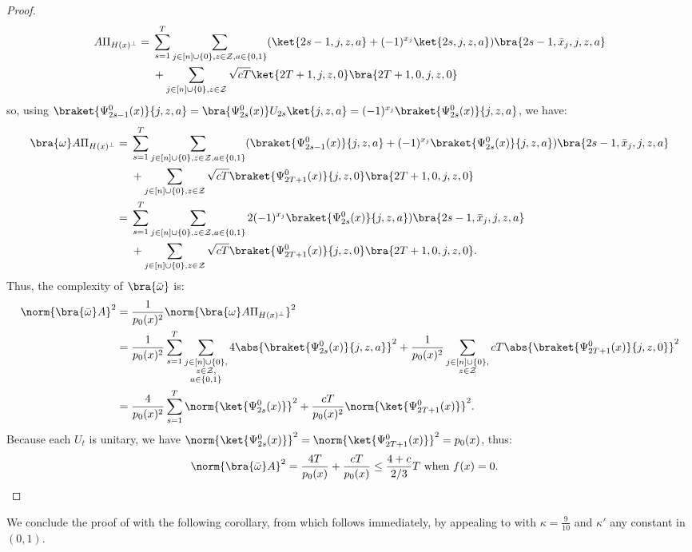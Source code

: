 \documentclass[11pt]{article}
\numberwithin{equation}{section}
\theoremstyle{definition}
\theoremstyle{plain}
\begin{document}
\begin{proof}
\begin{align*}
A\Pi_{H(x)^\bot} ={}& \sum_{s=1}^{T}\sum_{j\in [n]\cup\{0\},z\in{\cal Z},a\in\{0,1\}}(\ket{2s-1,j,z,a}+(-1)^{x_j}\ket{2s,j,z,a})\bra{2s-1,\bar{x}_j,j,z,a}\\
&+\sum_{j\in [n]\cup\{0\},z\in{\cal Z}}\sqrt{cT}\ket{2T+1,j,z,0}\bra{2T+1,0,j,z,0}
\end{align*}
so, using $\braket{\Psi_{2s-1}^0(x)}{j,z,a}=\bra{\Psi_{2s}^0(x)}U_{2s}\ket{j,z,a}=(-1)^{x_j}\braket{\Psi_{2s}^0(x)}{j,z,a}$, we have:
\begin{align*}
\bra{\omega}A\Pi_{H(x)^\bot} ={}& \sum_{s=1}^{T}\sum_{j\in [n]\cup\{0\},z\in{\cal Z},a\in\{0,1\}}(\braket{\Psi_{2s-1}^0(x)}{j,z,a}+(-1)^{x_j}\braket{\Psi_{2s}^0(x)}{j,z,a})\bra{2s-1,\bar{x}_j,j,z,a}\\
&+\sum_{j\in [n]\cup\{0\},z\in{\cal Z}}\sqrt{cT}\braket{\Psi_{2T+1}^0(x)}{j,z,0}\bra{2T+1,0,j,z,0}\\
={}& \sum_{s=1}^{T}\sum_{j\in [n]\cup\{0\},z\in{\cal Z},a\in\{0,1\}}2(-1)^{x_j}\braket{\Psi_{2s}^0(x)}{j,z,a})\bra{2s-1,\bar{x}_j,j,z,a}\\
&+\sum_{j\in [n]\cup\{0\},z\in{\cal Z}}\sqrt{cT}\braket{\Psi_{2T+1}^0(x)}{j,z,0}\bra{2T+1,0,j,z,0}.
\end{align*}
Thus, the complexity of $\bra{\bar\omega}$ is:
\begin{align*}
\norm{\bra{\bar{\omega}}A}^2 &= \frac{1}{p_0(x)^2}\norm{\bra{\omega}A\Pi_{H(x)^\bot}}^2\\
&= \frac{1}{p_0(x)^2}\sum_{s=1}^{T}\sum_{\substack{j\in [n]\cup\{0\},\\ z\in{\cal Z},\\ a\in\{0,1\}}}4\abs{\braket{\Psi_{2s}^0(x)}{j,z,a}}^2
+\frac{1}{p_0(x)^2}\sum_{\substack{j\in [n]\cup\{0\},\\ z\in{\cal Z}}}cT\abs{\braket{\Psi_{2T+1}^0(x)}{j,z,0}}^2\\
&= \frac{4}{p_0(x)^2}\sum_{s=1}^{T}\norm{\ket{\Psi_{2s}^0(x)}}^2 + \frac{cT}{p_0(x)^2}\norm{\ket{\Psi_{2T+1}^0(x)}}^2.
\end{align*}
Because each $U_t$ is unitary, we have $\norm{\ket{\Psi_{2s}^0(x)}}^2 = \norm{\ket{\Psi_{2T+1}^0(x)}}^2 = p_0(x)$, thus:
\begin{align*}
\norm{\bra{\bar{\omega}}A}^2 &=\frac{4T}{p_0(x)}+\frac{cT}{p_0(x)}\leq \frac{4+c}{2/3}T\mbox{ when $f(x)=0$}.\qedhere
\end{align*}
\end{proof}

We conclude the proof of  with the following corollary, from which  follows immediately, by appealing to  with $\kappa=\frac{9}{10}$ and $\kappa'$ any constant in $(0,1)$.
\end{document}
